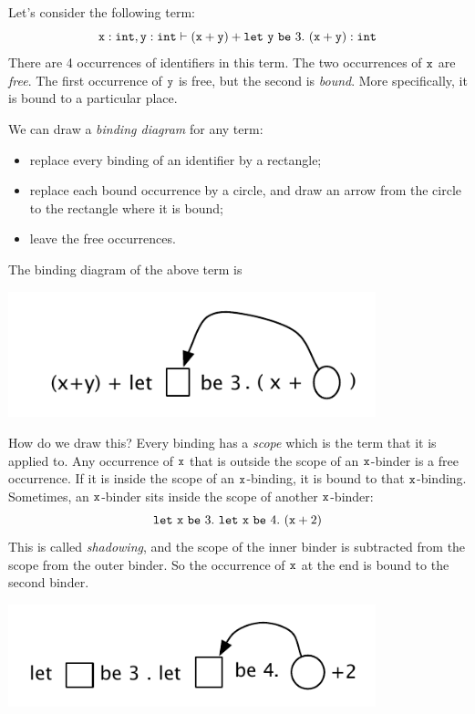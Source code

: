 \documentclass[runningheads,12pt]{llncs}
\newcommand{\ttletmac}[2]{\mathtt{let}\ {#2}\ \mathtt{be}\ {#1}.\ }
\begin{document}
Let's consider the following term:
\begin{displaymath}
  \ttx: \ttint, \tty: \ttint \vdash  (\ttx + \tty) + \ttletmac{ 3 }{ \tty } (\ttx + \tty) : \ttint
\end{displaymath}
There are 4 occurrences of identifiers in this term.  The two occurrences of $\mathtt{x}$ are \emph{free}. The first occurrence of $\mathtt{y}$ is free, but the second is \emph{bound}.  More specifically, it is bound to a particular place.

We can draw a \emph{binding diagram} for any term: 
\begin{itemize}
\item replace every binding of an identifier by a rectangle;
\item replace each bound occurrence by a circle, and draw an arrow from the circle to the rectangle where it is bound;
\item leave the free occurrences.
\end{itemize}
The binding diagram of the above term is

\includegraphics[width=0.8\textwidth]{bd1.pdf}

How do we draw this?  Every binding has a \emph{scope} which is the term that it is applied to.  Any occurrence of $\mathtt{x}$ that is outside the scope of an $\mathtt{x}$-binder is a free occurrence.  If it is inside the scope of an $\mathtt{x}$-binding, it is bound to that $\mathtt{x}$-binding.  Sometimes, an $\mathtt{x}$-binder sits inside the scope of another $\mathtt{x}$-binder:
\begin{displaymath}
  \ttletmac{ 3 }{ \ttx } \ttletmac{ 4 }{ \ttx } (\ttx + 2)
\end{displaymath}
This is called \emph{shadowing}, and the scope of the inner binder is subtracted  from the scope from the outer binder.  So the occurrence of $\mathtt{x}$ at the end is bound to the second binder.

\includegraphics[width=0.8\textwidth]{bd2.pdf}
\end{document}
